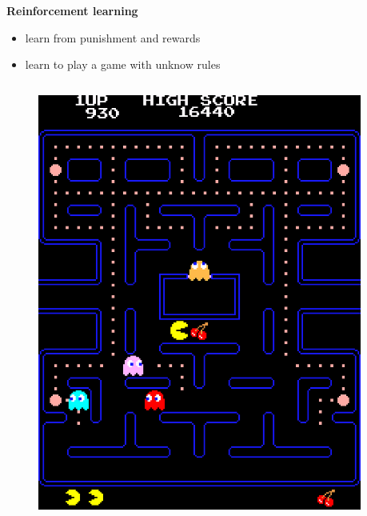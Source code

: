 \documentclass[xcolor=dvipsnames]{beamer}
\begin{document}
\begin{frame}{\bf Reinforcement learning}

\begin{itemize}
  \item learn from punishment and rewards
  \item learn to play a game with unknow rules
\end{itemize}

\begin{columns}
\begin{column}{0.5\textwidth}

  \begin{figure}
    \includegraphics[scale=0.5]{../../pictures/pacman.jpg}
  \end{figure}

\end{column}
\begin{column}{0.5\textwidth}  %


\end{column}
\end{columns}
\end{frame}
\end{document}
